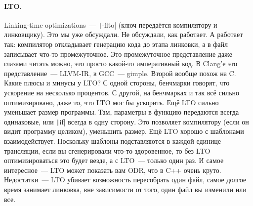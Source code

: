 \documentclass{article}
\begin{document}
    \paragraph{LTO.}
    Linking-time optimizations~--- \texttt|-flto| (ключ передаётся компилятору и линковщику). Это мы уже обсуждали. Не обсуждали, как работает. А работает так: компилятор откладывает генерацию кода до этапа линковки, а в файл записывает что-то промежуточное. Это промежуточное представление даже глазами читать можно, это просто какой-то императивный код. В Clang'е это представление~--- LLVM-IR, в GCC~--- gimple. Второй вообще похож на C. Какие плюсы и минусы у LTO? С одной стороны, бенчмарки говорят, что ускорение на несколько процентов. С другой, на бенчмарках и так всё сильно оптимизировано, даже то, что LTO мог бы ускорить. Ещё LTO сильно уменьшает размер программы. Там, параметры в функцию передаются всегда одинаковые, или \texttt|if| всегда в одну сторону. Это позволяет компилятору (если он видит программу целиком), уменьшить размер. Ещё LTO хорошо с шаблонами взаимодействует. Поскольку шаблоны подставляются в каждой единице трансляции, если вы сгенерировали что-то здоровенное, то без LTO оптимизироваться это будет везде, а с LTO~--- только один раз. И самое интересное~--- LTO может показать вам ODR, что в C++ очень круто. Недостатки~--- LTO убивает возможность пересобрать один файл, самое долгое время занимает линковка, вне зависимости от того, один файл вы изменили или все.
\end{document}
